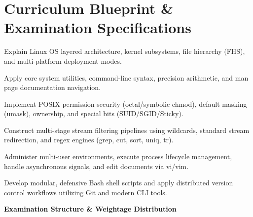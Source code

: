 \section*{Curriculum Blueprint \& Examination Specifications}

\begin{tcolorbox}[enhanced, colback=white, colframe=brandnavy, boxrule=1pt, arc=2mm, title={\Large\bfseries Course Outcomes (COs) \& Syllabus Mapping}]
\sffamily\small
\begin{description}[leftmargin=1.8em]
    \item[\textbf{CO1:}] Explain Linux OS layered architecture, kernel subsystems, file hierarchy (FHS), and multi-platform deployment modes.
    \item[\textbf{CO2:}] Apply core system utilities, command-line syntax, precision arithmetic, and man page documentation navigation.
    \item[\textbf{CO3:}] Implement POSIX permission security (octal/symbolic chmod), default masking (umask), ownership, and special bits (SUID/SGID/Sticky).
    \item[\textbf{CO4:}] Construct multi-stage stream filtering pipelines using wildcards, standard stream redirection, and regex engines (grep, cut, sort, uniq, tr).
    \item[\textbf{CO5:}] Administer multi-user environments, execute process lifecycle management, handle asynchronous signals, and edit documents via vi/vim.
    \item[\textbf{CO6:}] Develop modular, defensive Bash shell scripts and apply distributed version control workflows utilizing Git and modern CLI tools.
\end{description}
\end{tcolorbox}

\vspace{4mm}
\noindent
\textbf{\large Examination Structure \& Weightage Distribution}
\vspace{2mm}

